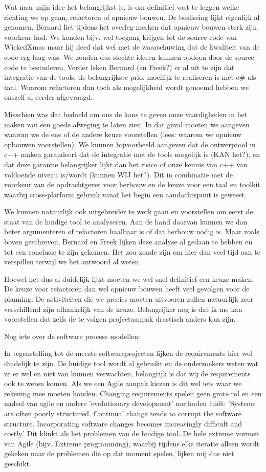 \documentclass[a4paper, draft]{article}
\begin{document}
Wat naar mijn idee het belangrijkst is, is om definitief vast te leggen welke richting we op gaan, refactoren of opnieuw bouwen. De beslissing lijkt eigenlijk al genomen, Bernard liet tijdens het overleg merken dat opnieuw bouwen sterk zijn voorkeur had. We konden bijv. wel toegang krijgen tot de source code van WickedXmas maar hij deed dat wel met de waarschuwing dat de kwaliteit van de code erg laag was. We zouden dus slechte ideeen kunnen opdoen door de source code te bestuderen. Verder leken Bernard (en Freek?) er al uit te zijn dat integratie van de tools, de belangrijkste prio, moeilijk te realiseren is met c\# als taal. Waarom refactoren dan toch als mogelijkheid wordt genoemd hebben we onszelf al eerder afgevraagd.

Misschien was dat bedoeld om ons de kans te geven onze vaardigheden in het maken van een goede afweging te laten zien. In dat geval moeten we aangeven waarom we de ene of de andere keuze voorstellen (lees: waarom we opnieuw opbouwen voorstellen). We kunnen bijvoorbeeld aangeven dat de ontwerptool in c++ maken garandeert dat de integratie met de tools mogelijk is (KAN het?), en dat deze garantie belangrijker lijkt dan het risico of onze kennis van c++ van voldoende niveau is/wordt (kunnen WIJ het?). Dit in combinatie met de voorkeur van de opdrachtgever voor herbouw en de keuze voor een taal en toolkit waarbij cross-platform gebruik vanaf het begin een aandachtspunt is geweest.

We kunnen natuurlijk ook uitgebreider te werk gaan en voorstellen om eerst de staat van de huidige tool te analyseren. Aan de hand daarvan kunnen we dan beter argumenteren of refactoren haalbaar is of dat herbouw nodig is. Maar zoals boven geschreven, Bernard en Freek lijken deze analyse al gedaan te hebben en tot een conclusie te zijn gekomen. Het zou zonde zijn om hier dan veel tijd aan te verspillen terwijl we het antwoord al weten.


Hoewel het dus al duidelijk lijkt moeten we wel snel definitief een keuze maken. De keuze voor refactoren dan wel opnieuw bouwen heeft veel gevolgen voor de planning. De activiteiten die we precies moeten uitvoeren zullen natuurlijk zeer verschillend zijn afhankelijk van de keuze. Belangrijker nog is dat ik me kan voorstellen dat zelfs de te volgen projectaanpak drastisch anders kan zijn.


Nog iets over de software process modellen:

In tegenstelling tot de meeste softwareprojecten lijken de requirements hier wel duidelijk te zijn. De huidige tool wordt al gebruikt en de onderzoekers weten wat ze er wel en niet van kunnen verwachten, belangrijk is dat wij de requirements ook te weten komen. Als we een Agile aanpak kiezen is dit wel iets waar we rekening mee moeten houden. Changing requirements spelen geen grote rol en een nadeel van agile en andere 'evolutionary development' methoden luidt: 'Systems are often poorly structured. Continual change tends to corrupt the software structure. Incorporating software changes becomes increasingly difficult and costly.' Dit klinkt als het problemen van de huidige tool. De hele extreme vormen van Agile (bijv. Extreme programming), waarbij tijdens elke iteratie alleen wordt gekeken naar de problemen die op dat moment spelen, lijken mij dus niet geschikt.
\end{document}
